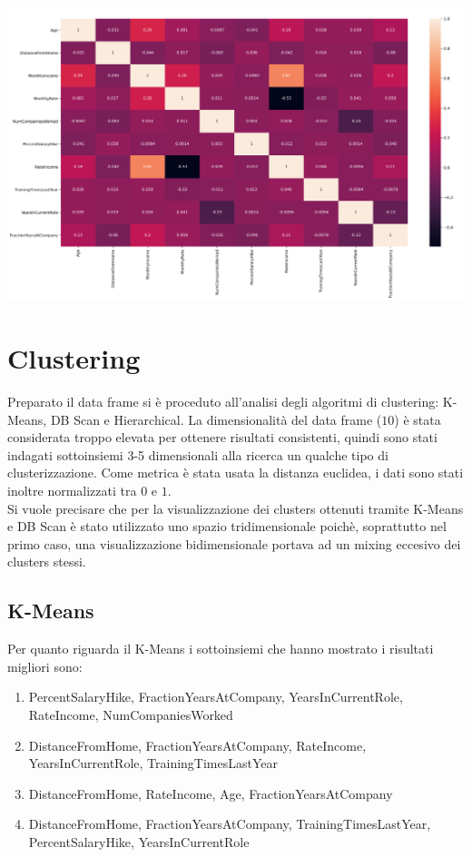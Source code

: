 \documentclass[a4paper,9pt]{article}
\begin{document}
\begin{center}
\includegraphics[scale=1.2]{macnum.png}
\end{center}

\section{Clustering}
Preparato il data frame si è proceduto all'analisi degli algoritmi di clustering: K-Means, DB Scan e Hierarchical. La dimensionalità del data frame ($10$) è stata considerata troppo elevata per ottenere risultati consistenti, quindi sono stati indagati sottoinsiemi 3-5 dimensionali alla ricerca un qualche tipo di clusterizzazione. 
Come metrica è stata usata la distanza euclidea, i dati sono stati inoltre normalizzati tra $0$ e $1$.\\
Si vuole precisare che per la visualizzazione dei clusters ottenuti tramite K-Means e DB Scan è stato utilizzato uno spazio tridimensionale poichè, soprattutto nel primo caso, una visualizzazione bidimensionale portava ad un mixing eccesivo dei clusters stessi.

\subsection{K-Means}
Per quanto riguarda il K-Means i sottoinsiemi che hanno mostrato i risultati migliori sono:\\

\begin{enumerate}
\item PercentSalaryHike, FractionYearsAtCompany, YearsInCurrentRole, RateIncome, NumCompaniesWorked
\item DistanceFromHome, FractionYearsAtCompany, RateIncome, YearsInCurrentRole, TrainingTimesLastYear
\item DistanceFromHome, RateIncome, Age, FractionYearsAtCompany
\item DistanceFromHome, FractionYearsAtCompany, TrainingTimesLastYear, PercentSalaryHike, YearsInCurrentRole
\end{enumerate}
\end{document}
